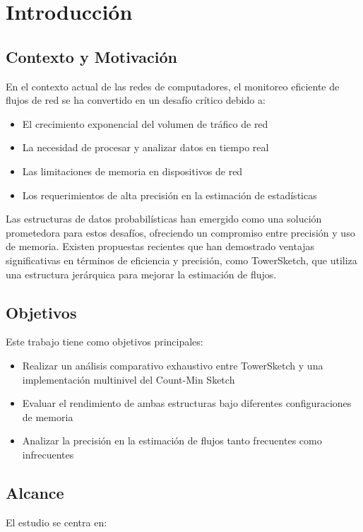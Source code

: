 \documentclass[a4paper,12pt]{article}
\begin{document}
\section{Introducción}
\subsection{Contexto y Motivación}
En el contexto actual de las redes de computadores, el monitoreo eficiente de flujos de red se ha convertido en un desafío crítico debido a:

\begin{itemize}
    \item El crecimiento exponencial del volumen de tráfico de red
    \item La necesidad de procesar y analizar datos en tiempo real
    \item Las limitaciones de memoria en dispositivos de red
    \item Los requerimientos de alta precisión en la estimación de estadísticas
\end{itemize}

Las estructuras de datos probabilísticas han emergido como una solución prometedora para estos desafíos, ofreciendo un compromiso entre precisión y uso de memoria. Existen propuestas recientes que han demostrado ventajas significativas en términos de eficiencia y precisión, como TowerSketch, que utiliza una estructura jerárquica para mejorar la estimación de flujos. 

\subsection{Objetivos}
Este trabajo tiene como objetivos principales:

\begin{itemize}
    \item Realizar un análisis comparativo exhaustivo entre TowerSketch y una implementación multinivel del Count-Min Sketch
    \item Evaluar el rendimiento de ambas estructuras bajo diferentes configuraciones de memoria
    \item Analizar la precisión en la estimación de flujos tanto frecuentes como infrecuentes
\end{itemize}

\subsection{Alcance}
El estudio se centra en:
\end{document}
